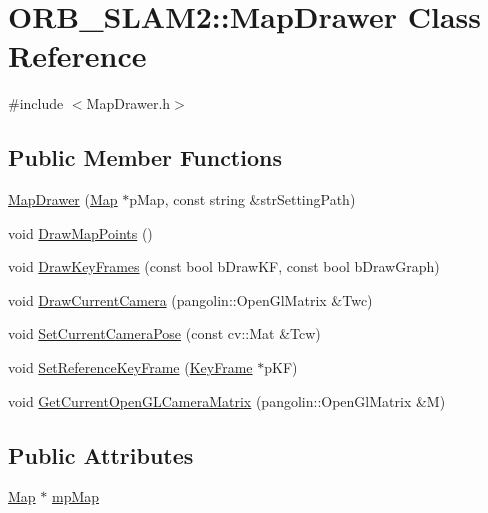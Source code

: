\hypertarget{class_o_r_b___s_l_a_m2_1_1_map_drawer}{}\section{O\+R\+B\+\_\+\+S\+L\+A\+M2\+:\+:Map\+Drawer Class Reference}
\label{class_o_r_b___s_l_a_m2_1_1_map_drawer}


{\ttfamily \#include $<$Map\+Drawer.\+h$>$}

\subsection*{Public Member Functions}
\begin{DoxyCompactItemize}
\item 
\mbox{\hyperlink{class_o_r_b___s_l_a_m2_1_1_map_drawer_a649a10671736e192e85a6d824d776fc1}{Map\+Drawer}} (\mbox{\hyperlink{class_o_r_b___s_l_a_m2_1_1_map}{Map}} $\ast$p\+Map, const string \&str\+Setting\+Path)
\item 
void \mbox{\hyperlink{class_o_r_b___s_l_a_m2_1_1_map_drawer_a79991cc944076440e4ce4326436da285}{Draw\+Map\+Points}} ()
\item 
void \mbox{\hyperlink{class_o_r_b___s_l_a_m2_1_1_map_drawer_a5e00f408c3c2d1878ca53930903caa5f}{Draw\+Key\+Frames}} (const bool b\+Draw\+KF, const bool b\+Draw\+Graph)
\item 
void \mbox{\hyperlink{class_o_r_b___s_l_a_m2_1_1_map_drawer_af8d3dec705fc048dac229cf682bfceb1}{Draw\+Current\+Camera}} (pangolin\+::\+Open\+Gl\+Matrix \&Twc)
\item 
void \mbox{\hyperlink{class_o_r_b___s_l_a_m2_1_1_map_drawer_ac8c03502b5878303b31816ce5dfd9c0a}{Set\+Current\+Camera\+Pose}} (const cv\+::\+Mat \&Tcw)
\item 
void \mbox{\hyperlink{class_o_r_b___s_l_a_m2_1_1_map_drawer_ac72cc0b3e9e3a92527b38ca12230e79c}{Set\+Reference\+Key\+Frame}} (\mbox{\hyperlink{class_o_r_b___s_l_a_m2_1_1_key_frame}{Key\+Frame}} $\ast$p\+KF)
\item 
void \mbox{\hyperlink{class_o_r_b___s_l_a_m2_1_1_map_drawer_a872b93687086460e398e912191c91aca}{Get\+Current\+Open\+G\+L\+Camera\+Matrix}} (pangolin\+::\+Open\+Gl\+Matrix \&M)
\end{DoxyCompactItemize}
\subsection*{Public Attributes}
\begin{DoxyCompactItemize}
\item 
\mbox{\hyperlink{class_o_r_b___s_l_a_m2_1_1_map}{Map}} $\ast$ \mbox{\hyperlink{class_o_r_b___s_l_a_m2_1_1_map_drawer_aa10e7a80919749c11774eb84219f0a4b}{mp\+Map}}
\end{DoxyCompactItemize}


